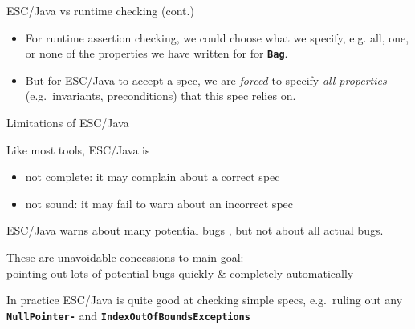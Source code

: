 \documentclass[
nocolorBG,
slideColor,
pdf,
erik,
]{prosper}
\newcommand{\code}[1]{{\rm \texttt{\textbf{\small #1}}}}
\begin{document}

\begin{slide}{ESC/Java vs runtime checking (cont.)}
\vspace*{-3ex}
\begin{itemize}
\item For {\green runtime assertion checking}, we could {\green choose
    what we specify}, e.g. all, one, or none of the properties we have
  written for for \code{Bag}.
\item But for {\blue ESC/Java} to accept a spec, we are {\em {\blue
      forced}} to specify {\em {\blue all properties}} (e.g.\ 
  invariants, preconditions) that this spec relies on.
\end{itemize}
\end{slide}

\begin{slide}{Limitations of ESC/Java}
\vspace*{-3ex}

Like most tools, ESC/Java is
\begin{itemize}
\item {\blue not complete}: it may {\green complain about a correct spec}
\item {\blue not sound}: it may {\green fail to warn about an incorrect spec}
\end{itemize}
ESC/Java warns about {\green many potential bugs} , but {\green not
  about all actual bugs.}

\medskip

These are unavoidable concessions to main goal:\\
{\green pointing out lots of potential bugs quickly \& completely
  automatically}

\medskip

In practice ESC/Java is quite good at checking simple specs, e.g.\ 
ruling out any \code{NullPointer-} and
\code{IndexOutOfBounds\-Exceptions}

\end{slide}
\end{document}

